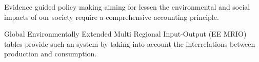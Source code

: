 Evidence guided policy making aiming for lessen the environmental and social
impacts of our society require a comprehensive accounting principle. 

Global Environmentally Extended Multi Regional Input-Output (EE MRIO) tables provide such an system by taking into account the interrelations between production and consumption.